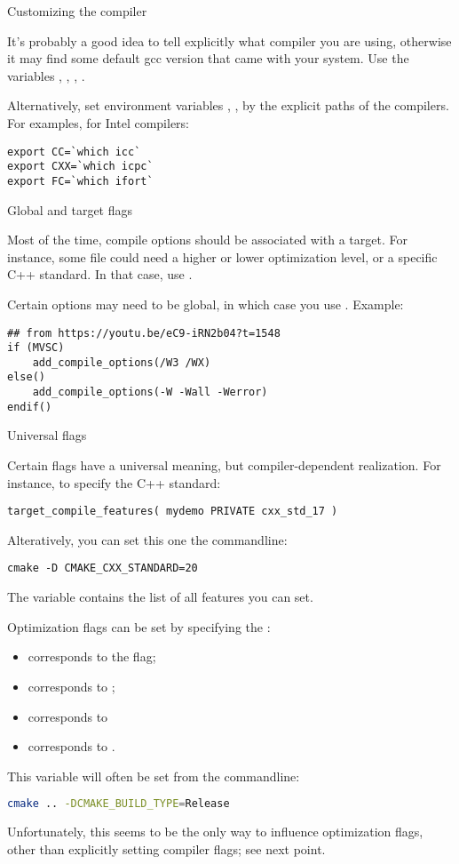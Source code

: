  {Customizing the compiler}

It's probably a good idea to tell  explicitly what compiler you are using,
otherwise it may find some default gcc version that came with your system.
Use the variables , ,
,
.

Alternatively, set environment variables
, , 
by the explicit paths of the compilers.
For examples, for Intel compilers:
\begin{lstlisting}
export CC=`which icc`
export CXX=`which icpc`
export FC=`which ifort`
\end{lstlisting}

 {Global and target flags}

Most of the time, compile options should be associated with a target.
For instance, some file could need a higher or lower optimization level,
or a specific C++ standard.
In that case, use .

Certain options may need to be global, in which case you use
. Example:
\begin{lstlisting}
## from https://youtu.be/eC9-iRN2b04?t=1548
if (MVSC)
    add_compile_options(/W3 /WX)
else()
    add_compile_options(-W -Wall -Werror)
endif()
\end{lstlisting}

 {Universal flags}

Certain flags have a universal meaning, but compiler-dependent realization.
For instance, to specify the C++ standard:
\begin{lstlisting}
target_compile_features( mydemo PRIVATE cxx_std_17 )
\end{lstlisting}
Alteratively, you can set this one the commandline:
\begingroup\lstset{language=Bash}
\begin{lstlisting}
cmake -D CMAKE_CXX_STANDARD=20
\end{lstlisting}
\endgroup
The variable 
contains the list of all features you can set.

Optimization flags can be set by specifying the :
\begin{itemize}
\item 
     corresponds to the  flag;
\item
     corresponds to ;
\item
     corresponds to 
\item 
     corresponds to .
\end{itemize}
This variable will often be set from the commandline:
\begin{lstlisting}[language=bash]
cmake .. -DCMAKE_BUILD_TYPE=Release
\end{lstlisting}
Unfortunately, this seems to be the only way to influence optimization flags,
other than explicitly setting compiler flags; see next point.

